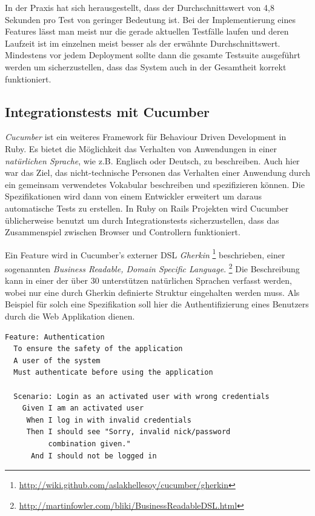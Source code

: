 In der Praxis hat sich herausgestellt, dass der Durchschnittswert von
4,8 Sekunden pro Test von geringer Bedeutung ist. Bei der
Implementierung eines Features lässt man meist nur die gerade
aktuellen Testfälle laufen und deren Laufzeit ist im einzelnen meist
besser als der erwähnte Durchschnittswert. Mindestens vor jedem
Deployment sollte dann die gesamte Testsuite ausgeführt werden um
sicherzustellen, dass das System auch in der Gesamtheit korrekt
funktioniert.

\subsection{Integrationstests mit Cucumber}

\textit{Cucumber} \cite{cucumber} ist ein weiteres Framework für
Behaviour Driven Development in Ruby. Es bietet die Möglichkeit das
Verhalten von Anwendungen in einer \textit{natürlichen Sprache}, wie
z.B. Englisch oder Deutsch, zu beschreiben. Auch hier war das Ziel,
das nicht-technische Personen das Verhalten einer Anwendung durch ein
gemeinsam verwendetes Vokabular beschreiben und spezifizieren können.
Die Spezifikationen wird dann von einem Entwickler erweitert um daraus
automatische Tests zu erstellen. In Ruby on Rails Projekten wird
Cucumber üblicherweise benutzt um durch Integrationstests
sicherzustellen, dass das Zusammenspiel zwischen Browser und
Controllern funktioniert.

Ein Feature wird in Cucumber's externer DSL \textit{Gherkin}
\footnote{\url{http://wiki.github.com/aslakhellesoy/cucumber/gherkin}}
beschrieben, einer sogenannten \textit{Business Readable, Domain
  Specific Language}.
\footnote{\url{http://martinfowler.com/bliki/BusinessReadableDSL.html}}
Die Beschreibung kann in einer der über 30 unterstützen natürlichen
Sprachen verfasst werden, wobei nur eine durch Gherkin definierte
Struktur eingehalten werden muss. Als Beispiel für solch eine
Spezifikation soll hier die Authentifizierung eines Benutzers durch
die Web Applikation dienen.

\begin{lstlisting}[caption=Spezifikation eines Features mit Cucumber]
Feature: Authentication
  To ensure the safety of the application
  A user of the system
  Must authenticate before using the application

  Scenario: Login as an activated user with wrong credentials
    Given I am an activated user
     When I log in with invalid credentials
     Then I should see "Sorry, invalid nick/password
          combination given."
      And I should not be logged in
\end{lstlisting}

